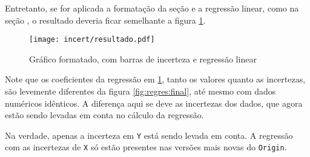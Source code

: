     Entretanto, se for aplicada a formatação da seção  e a regressão linear, como na seção , o resultado deveria ficar semelhante a figura \ref{fig:incert:resultado}.

    \begin{figure}[htbp]
        \centering
        \texttt{[image: incert/resultado.pdf]}

        \caption{Gráfico formatado, com barras de incerteza e regressão linear}
        \label{fig:incert:resultado}
    \end{figure}

    \begin{nota}
        Note que os coeficientes da regressão em \ref{fig:incert:resultado}, tanto os valores quanto as incertezas, são levemente diferentes da figura \ref{fig:regres:final}, até mesmo com dados numéricos idênticos. A diferença aqui se deve as incertezas dos dados, que agora estão sendo levadas em conta no cálculo da regressão.

        Na verdade, apenas a incerteza em \texttt{Y} está sendo levada em conta. A regressão com as incertezas de \texttt{X} só estão presentes nas versões mais novas do \texttt{Origin}.
    \end{nota}
